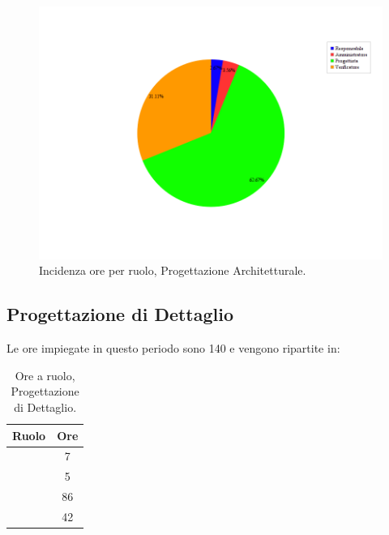 \begin{figure}[H]
	\centering
	\includegraphics[scale=0.5]{immagini/Grafi/OreRuoloPA}
	\caption{Incidenza ore per ruolo, Progettazione Architetturale.}
\end{figure}


\subsection{Progettazione di Dettaglio}
Le ore impiegate in questo periodo sono 140 e vengono ripartite in:
\begin{table}[H]
	\begin{center}
		\begin{tabular}{|c|c|}
			\hline
			\textbf{Ruolo}	& \textbf{Ore} \\
			\hline
			\Res	&	7	\\
			\hline
			\Amm	&	5	\\
			\hline
			\Prog		&	86	\\
			\hline
			\Ver	&	42	\\
			\hline
		\end{tabular}
	\end{center}
	\caption{Ore a ruolo, Progettazione di Dettaglio.}
\end{table}

